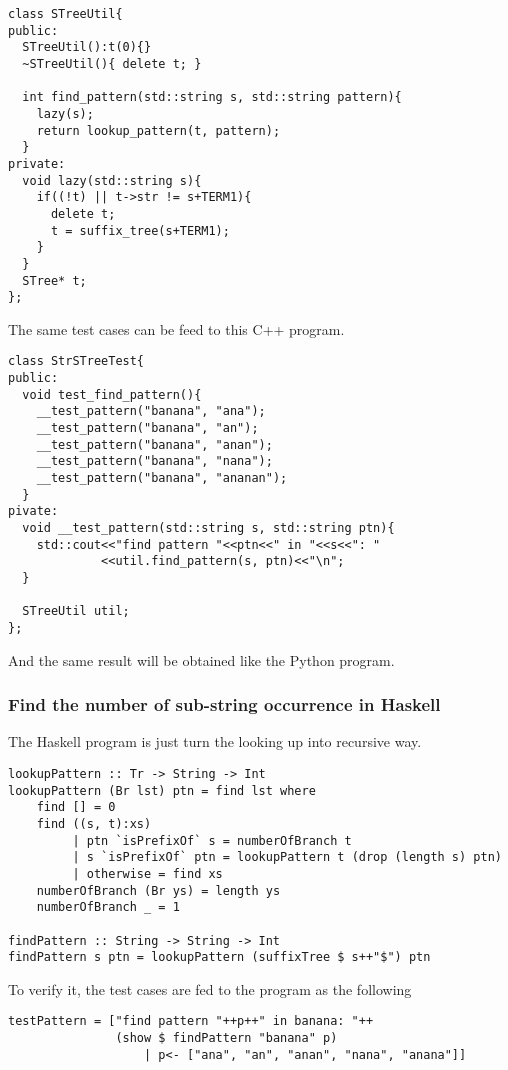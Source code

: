 \documentclass{article}
\begin{document}
\begin{lstlisting}
class STreeUtil{
public:
  STreeUtil():t(0){}
  ~STreeUtil(){ delete t; }

  int find_pattern(std::string s, std::string pattern){
    lazy(s);
    return lookup_pattern(t, pattern);
  }
private:
  void lazy(std::string s){
    if((!t) || t->str != s+TERM1){
      delete t;
      t = suffix_tree(s+TERM1);
    }
  }
  STree* t;
};
\end{lstlisting}

The same test cases can be feed to this C++ program.

\begin{lstlisting}
class StrSTreeTest{
public:
  void test_find_pattern(){
    __test_pattern("banana", "ana");
    __test_pattern("banana", "an");
    __test_pattern("banana", "anan");
    __test_pattern("banana", "nana");
    __test_pattern("banana", "ananan");
  }
pivate:
  void __test_pattern(std::string s, std::string ptn){
    std::cout<<"find pattern "<<ptn<<" in "<<s<<": "
             <<util.find_pattern(s, ptn)<<"\n";
  }

  STreeUtil util;
};
\end{lstlisting}

And the same result will be obtained like the Python program.

\subsubsection*{Find the number of sub-string occurrence in Haskell}
The Haskell program is just turn the looking up into recursive way.

\lstset{language=Haskell}
\begin{lstlisting}
lookupPattern :: Tr -> String -> Int
lookupPattern (Br lst) ptn = find lst where
    find [] = 0
    find ((s, t):xs)
         | ptn `isPrefixOf` s = numberOfBranch t
         | s `isPrefixOf` ptn = lookupPattern t (drop (length s) ptn)
         | otherwise = find xs
    numberOfBranch (Br ys) = length ys
    numberOfBranch _ = 1

findPattern :: String -> String -> Int
findPattern s ptn = lookupPattern (suffixTree $ s++"$") ptn
\end{lstlisting}

To verify it, the test cases are fed to the program as the following
\begin{lstlisting}
testPattern = ["find pattern "++p++" in banana: "++
               (show $ findPattern "banana" p)
                   | p<- ["ana", "an", "anan", "nana", "anana"]]
\end{lstlisting} %
\end{document}

